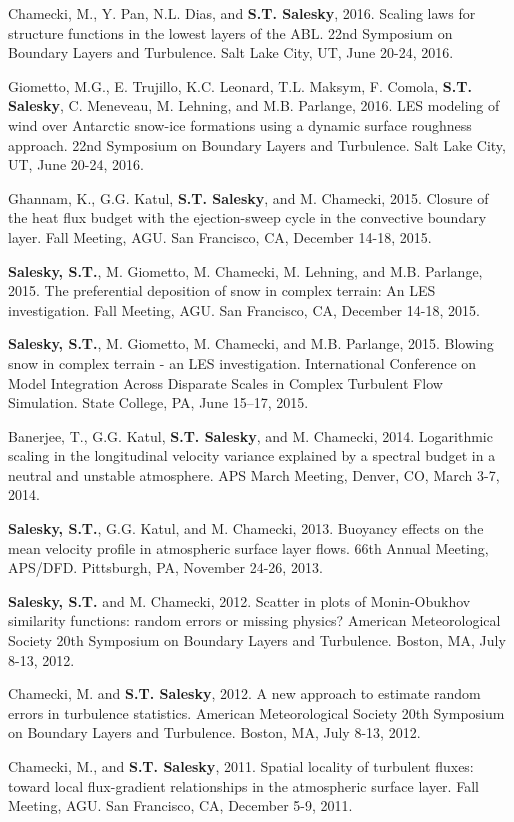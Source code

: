 \documentclass[11pt,letterpaper]{article}
\begin{document}
Chamecki, M., Y. Pan, N.L. Dias, and \textbf{S.T. Salesky}, 2016. Scaling laws for
structure functions in the lowest layers of the ABL.  22nd Symposium on
Boundary Layers and Turbulence. Salt Lake City, UT, June 20-24, 2016.

Giometto, M.G., E. Trujillo, K.C. Leonard, T.L. Maksym, F. Comola, \textbf{S.T.
  Salesky}, C. Meneveau, M. Lehning, and M.B. Parlange, 2016.  LES modeling of
wind over Antarctic snow-ice formations using a dynamic surface roughness
approach.  22nd Symposium on Boundary Layers and Turbulence. Salt Lake City,
UT, June 20-24, 2016.

Ghannam, K., G.G. Katul, \textbf{S.T. Salesky}, and M. Chamecki, 2015. Closure of the heat flux budget with the ejection-sweep cycle in the convective boundary layer. Fall Meeting, AGU. San Francisco, CA, December 14-18, 2015.

\textbf{Salesky, S.T.}, M. Giometto, M. Chamecki, M. Lehning, and M.B. Parlange, 2015. The preferential deposition of snow in complex terrain: An LES investigation. Fall Meeting, AGU. San Francisco, CA, December 14-18, 2015.

\textbf{Salesky, S.T.}, M. Giometto, M. Chamecki, and M.B. Parlange, 2015. Blowing snow in complex terrain - an LES investigation. International Conference on Model Integration Across Disparate Scales in Complex Turbulent Flow Simulation. State College, PA, June 15--17, 2015. 

Banerjee, T., G.G. Katul, \textbf{S.T. Salesky}, and M. Chamecki, 2014. Logarithmic scaling in the longitudinal velocity variance explained by a spectral budget in a neutral and unstable atmosphere. APS March Meeting, Denver, CO, March 3-7, 2014. 

\textbf{Salesky, S.T.}, G.G. Katul, and M. Chamecki, 2013. Buoyancy effects on the mean velocity profile in atmospheric surface layer flows. 66th Annual Meeting, APS/DFD. Pittsburgh, PA, November 24-26, 2013. 

\textbf{Salesky, S.T.} and M. Chamecki, 2012. Scatter in plots of Monin-Obukhov similarity functions: random errors or missing physics? American Meteorological Society 20th Symposium on Boundary Layers and Turbulence. Boston, MA, July 8-13, 2012. 

Chamecki, M. and \textbf{S.T. Salesky}, 2012. A new approach to estimate random errors in turbulence statistics. American Meteorological Society 20th Symposium on Boundary Layers and Turbulence. Boston, MA, July 8-13, 2012. 

Chamecki, M., and \textbf{S.T. Salesky}, 2011. Spatial locality of turbulent fluxes: toward local flux-gradient relationships in the atmospheric surface layer. Fall Meeting, AGU. San Francisco, CA, December 5-9, 2011. 
\end{document}
